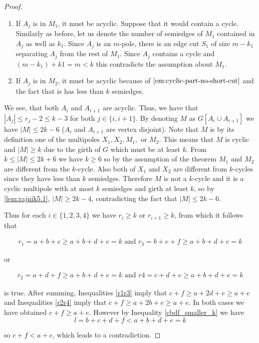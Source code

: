 \begin{proof}
	\begin{enumerate}
		\item If $A_j$ is in $M_1$, it must be acyclic. Suppose that it would contain a cycle. Similarly as before, let us denote the number of semiedges of $M_1$ contained in $A_j$ as well as $k_1$. Since $A_j$ is an $m$-pole, there is an edge cut $S_1$ of size $m-k_1$ separating $A_j$ from the rest of $M_1$. Since $A_j$ contains a cycle and $(m-k_1)+k1=m<k$ this contradicts the assumption about $M_1$.
		\item If $A_j$ is in $M_2$, it must be acyclic because of $\cref{em:cyclic-part-no-short-cut}$ and the fact that is has less than $k$ semiedges.
	\end{enumerate}

	We see, that both $A_i$ and $A_{i+1}$ are acyclic. Thus, we have that $|A_j|\leq r_j-2\leq k-3$ for both $j\in \{i, i+1\}$. By denoting $M$ as $G[A_i\cup A_{i+1}]$ we have $|M|\leq 2k-6$ ($A_i$ and $A_{i+1}$ are vertex disjoint). Note that $M$ is by its definition one of the multipoles $X_1, X_2, M_1,$ or $M_2$. This means that $M$ is cyclic and $|M|\geq k$ due to the girth of $G$ which must be at least $k$. From $k\leq |M|\leq 2k+6$ we have $k\geq 6$ so by the assumption of the theorem $M_1$ and $M_2$ are different from the $k$-cycle. Also both of $X_1$ and $X_2$ are different from $k$-cycles since they have less than $k$ semiedges. Therefore $M$ is not a $k$-cycle and it is a cyclic multipole with at most $k$ semiedges and girth at least $k$, so by \cref{lem:rajnik5.1}, $|M| \geq 2k - 4$, contradicting the fact that $|M|\leq 2k-6$.
	
	Thus for each $i\in\{1,2,3,4\}$ we have $r_i\geq k$ or $r_{i+1}\geq k$, from which it follows that
	
	\begin{align}
		r_1 =a+b+c\geq a+b+d+e=k \text{ and } r_3 =b+e+f \geq a+b+d+e=k\label{r1r3}
	\end{align}

	or
	
	\begin{align}
		r_2 =a+d+f \geq a+b+d+e=k \text{ and } r4 =c+d+e\geq a+b+d+e=k\label{r2r4}
	\end{align}

	is true. After summing, Inequalities \cref{r1r3} imply that $c+f\geq a+2d+e\geq a+e$ and Inequalities \cref{r2r4} imply that $c+f\geq a+2b+e\geq a+e$. In both cases we have obtained $c+f\geq a+e$. However by Inequality \cref{cbdf_smaller_k} we have 
	$$l=b+c+d+f<a+b+d+e=k$$
	
	so $c+f<a+e$, which leads to a contradiction.
\end{proof}

